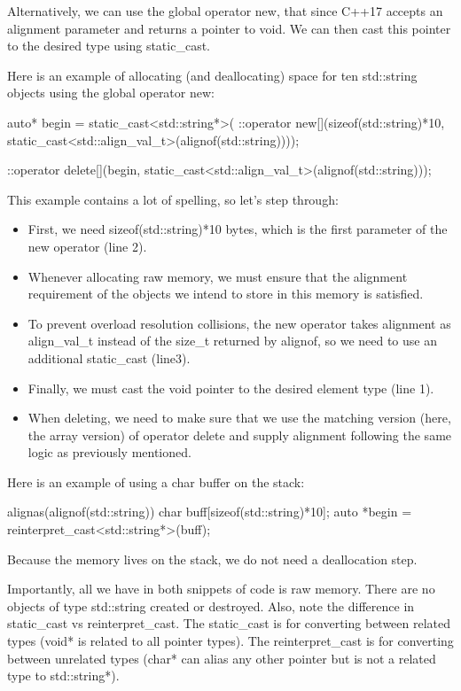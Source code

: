 Alternatively, we can use the global operator new, that since C++17 accepts an alignment parameter and returns a pointer to void. We can then cast this pointer to the desired type using static\_cast.

Here is an example of allocating (and deallocating) space for ten std::string objects using the global operator new:

\begin{box-note}
\begin{cppcode}
auto* begin = static_cast<std::string*>(
                  ::operator new[](sizeof(std::string)*10, 
                                   static_cast<std::align_val_t>(alignof(std::string))));

::operator delete[](begin, static_cast<std::align_val_t>(alignof(std::string)));
\end{cppcode}
\end{box-note}

This example contains a lot of spelling, so let’s step through:

\begin{itemize}
    \item First, we need sizeof(std::string)*10 bytes, which is the first parameter of the new operator (line 2).
    \item Whenever allocating raw memory, we must ensure that the alignment requirement of the objects we intend to store in this memory is satisfied.
    \item To prevent overload resolution collisions, the new operator takes alignment as align\_val\_t instead of the size\_t returned by alignof, so we need to use an additional static\_cast (line3).
    \item Finally, we must cast the void pointer to the desired element type (line 1).
    \item When deleting, we need to make sure that we use the matching version (here, the array version) of operator delete and supply alignment following the same logic as previously mentioned.
\end{itemize}

Here is an example of using a char buffer on the stack:

\begin{box-note}
\begin{cppcode}
alignas(alignof(std::string)) char buff[sizeof(std::string)*10];
auto *begin = reinterpret_cast<std::string*>(buff);
\end{cppcode}
\end{box-note}

Because the memory lives on the stack, we do not need a deallocation step.

Importantly, all we have in both snippets of code is raw memory. There are no objects of type std::string created or destroyed. Also, note the difference in static\_cast vs reinterpret\_cast. The static\_cast is for converting between related types (void* is related to all pointer types). The reinterpret\_cast is for converting between unrelated types (char* can alias any other pointer but is not a related type to std::string*).